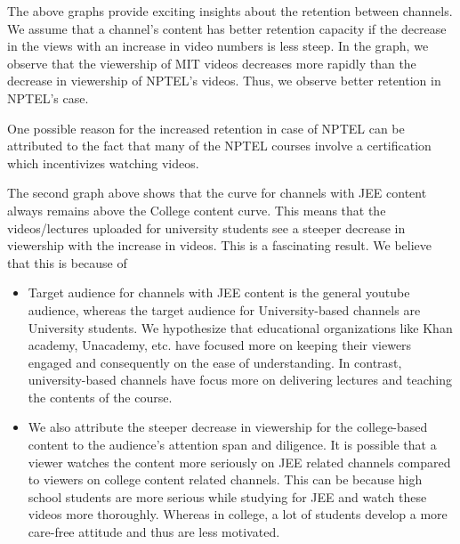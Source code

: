 \documentclass{article}
\begin{document}

The above graphs provide exciting insights about the retention between channels. We assume that a channel's content has better retention capacity if the decrease in the views with an increase in video numbers is less steep. In the graph, we observe that the viewership of MIT videos decreases more rapidly than the decrease in viewership of NPTEL's videos. Thus, we observe better retention in NPTEL's case.

One possible reason for the increased retention in case of NPTEL can be attributed to the fact that many of the NPTEL courses involve a certification which incentivizes watching videos.

The second graph above shows that the curve for channels with JEE content always remains above the College content curve. This means that the videos/lectures uploaded for university students see a steeper decrease in viewership with the increase in videos.  This is a fascinating result. We believe that this is because of 
\begin{itemize}
\item Target audience for channels with JEE content is the general youtube audience, whereas the target audience for University-based channels are University students. We hypothesize that educational organizations like Khan academy, Unacademy, etc. have focused more on keeping their viewers engaged and consequently on the ease of understanding. In contrast, university-based channels have focus more on delivering lectures and teaching the contents of the course.
\item We also attribute the steeper decrease in viewership for the college-based content to the audience's attention span and diligence. It is possible that a viewer watches the content more seriously on JEE related channels compared to viewers on college content related channels. This can be because high school students are more serious while studying for JEE and watch these videos more thoroughly. Whereas in college, a lot of students develop a more care-free attitude and thus are less motivated.

\end{itemize}

\end{document}
